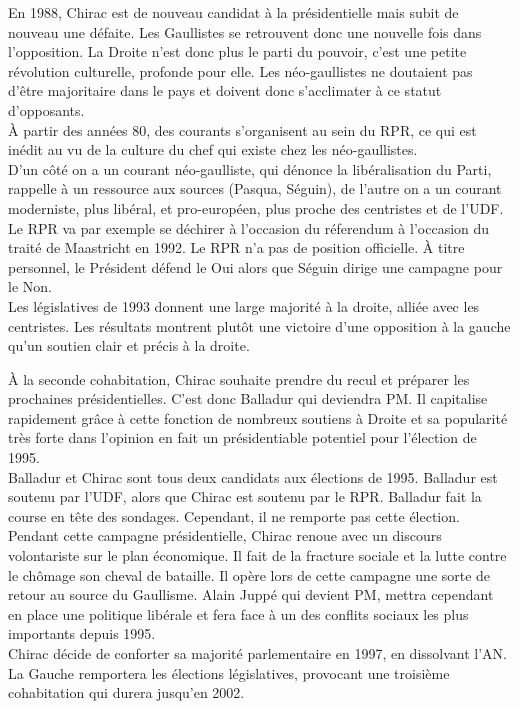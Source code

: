 \documentclass[10pt, a4paper, openany]{book}
\begin{document}
En 1988, Chirac est de nouveau candidat à la présidentielle mais subit de nouveau une défaite. Les Gaullistes se retrouvent donc une nouvelle fois dans l'opposition. La Droite n'est donc plus le parti du pouvoir, c'est une petite révolution culturelle, profonde pour elle. Les néo-gaullistes ne doutaient pas d'être majoritaire dans le pays et doivent donc s'acclimater à ce statut d'opposants. \\
À partir des années 80, des courants s'organisent au sein du RPR, ce qui est inédit au vu de la culture du chef qui existe chez les néo-gaullistes. \\
D'un côté on a un courant néo-gaulliste, qui dénonce la libéralisation du Parti, rappelle à un ressource aux sources (Pasqua, Séguin), de l'autre on a un courant moderniste, plus libéral, et pro-européen, plus proche des centristes et de l'UDF. Le RPR va par exemple se déchirer à l'occasion du réferendum à l'occasion du traité de Maastricht en 1992. Le RPR n'a pas de position officielle. À titre personnel, le Président défend le Oui alors que Séguin dirige une campagne pour le Non. \\
Les législatives de 1993 donnent une large majorité à la droite, alliée avec les centristes. Les résultats montrent plutôt une victoire d'une opposition à la gauche qu'un soutien clair et précis à la droite. 


À la seconde cohabitation, Chirac souhaite prendre du recul et préparer les prochaines présidentielles. C'est donc Balladur qui deviendra PM. Il capitalise rapidement grâce à cette fonction de nombreux soutiens à Droite et sa popularité très forte dans l'opinion en fait un présidentiable potentiel pour l'élection de 1995. \\
Balladur et Chirac sont tous deux candidats aux élections de 1995. Balladur est soutenu par l'UDF, alors que Chirac est soutenu par le RPR. Balladur fait la course en tête des sondages. Cependant, il ne remporte pas cette élection. \\
Pendant cette campagne présidentielle, Chirac renoue avec un discours volontariste sur le plan économique. Il fait de la fracture sociale et la lutte contre le chômage son cheval de bataille. Il opère lors de cette campagne une sorte de retour au source du Gaullisme. Alain Juppé qui devient PM, mettra cependant en place une politique libérale et fera face à un des conflits sociaux les plus importants depuis 1995. \\
Chirac décide de conforter sa majorité parlementaire en 1997, en dissolvant l'AN. La Gauche remportera les élections législatives, provocant une troisième cohabitation qui durera jusqu'en 2002. 
\end{document}
